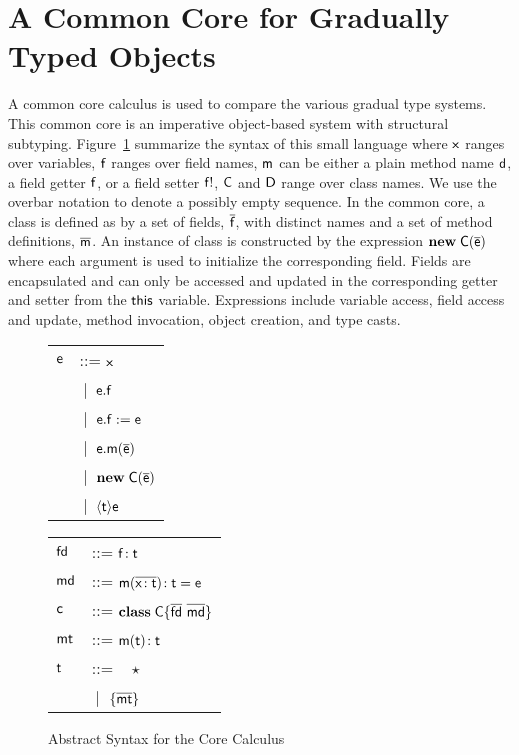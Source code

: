 \documentclass[preprint]{sigplanconf}
\newcommand{\fd}{\M{\xt{fd}}}
\newcommand{\md}{\M{\xt{md}}}
\newcommand{\mt}{\M{\xt{mt}}}
\newcommand{\m}{\M{\xt{m}}}
\newcommand{\e}{\M{\xt{e}}}
\renewcommand{\d}{\M{\xt{d}}}
\newcommand{\f}{\M{\xt{f}}}
\newcommand{\fb}{\M{\xt{f!}}}
\newcommand{\x}{\M{\xt{x}}}
\renewcommand{\t}{\M{\xt{t}}}
\renewcommand{\c}{\M{\xt{c}}}
\newcommand{\C}{\M{\xt{C}}}
\newcommand{\D}{\M{\xt{D}}}
\newcommand{\this}{\M{\xt{this}}}
\renewcommand{\d}{\M{\xt{d}}}
\newcommand{\new}{\M{\bt{new}}}
\newcommand{\Get}[2]{\M{#1.#2}}
\newcommand{\Set}[3]{\M{#1.#2:=#3}}
\newcommand{\Call}[3]{\M{#1.#2(#3)}}
\newcommand{\New}[2]{\M{\new\;#1({#2})}}
\newcommand{\Cast}[2]{\M{\langle{#1}\rangle{#2}}}
\newcommand{\any}{\M{\star}}
\newcommand{\Type}[1]{\M{\{ #1 \}}}
\newcommand{\HT}[2]{\M{{#1}\!:{#2}}}
\newcommand{\Mdef}[5]{\M{ \HT { #1( \b{\HT{#2}{#3}})}{#4}={#5}}}
\newcommand{\Ftype}[2]{\M{ \HT{#1}{#2} }}
\newcommand{\Mtype}[3]{\M{ \HT { #1( #2 )}{#3}}}
\newcommand{\Class}[3]{\M{\bt{class}\;#1\{ #2 ~ #3 \}}}
\newcommand{\Alt}[1]{ &\B #1 \\}
\newcommand{\B}{\M{~|~}}
\newcommand{\M}[1]{\ensuremath{#1}\xspace}
\newcommand{\xt}[1]{\sf{#1}}
\newcommand{\bt}[1]{\xt{\bf #1}}
\renewcommand{\b}[1]{\M{\overline{#1}}}
\begin{document}
\section{A Common Core for Gradually Typed Objects}



A common core calculus is used to compare the various gradual type
systems. This common core is an imperative object-based system with
structural subtyping. Figure~\ref{syn} summarize the syntax of this small
language where \x ranges over variables, \f ranges over field names, \m can
be either a plain method name \d, a field getter \f, or a field setter \fb,
\C and \D range over class names. We use the overbar notation to denote a
possibly empty sequence. In the common core, a class is defined as by a set
of fields, \b\f, with distinct names and a set of method definitions,
\b\m. An instance of class is constructed by the expression \New\C{\b\e} where
each argument is used to initialize the corresponding field. Fields are
encapsulated and can only be accessed and updated in the corresponding
getter and setter from the \this variable.  Expressions include variable
access, field access and update, method invocation, object creation, and
type casts.



\begin{figure}[!h]\begin{minipage}{3cm}\begin{tabular}{l@{~~~}l}
\e &::=  \x \\
   \Alt{ \Get\e\f }
   \Alt{ \Set\e\f\e }
   \Alt{ \Call\e\m{\b\e} }
   \Alt{ \New\C{\b\e} }
   \Alt{ \Cast\t\e }
\end{tabular}\end{minipage}\begin{minipage}{3cm}\begin{tabular}{l@{~~~}l}
\fd &::= 
    \Ftype\f\t   \\
\md &::=
    \Mdef\m\x\t\t\e \\
\c &::= \Class \C {\b{\fd}}{\b{\md} } \\
\mt &::= \Mtype\m\t\t\\
\t &::= ~ \any \\
   \Alt{ \Type{  \b{ \mt } } }
\end{tabular}\end{minipage}
\caption{Abstract Syntax for the Core Calculus}\label{syn}
\end{figure}
\end{document}
